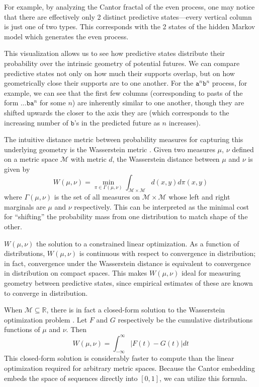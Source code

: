 \documentclass[sigconf, anonymous, review]{acmart}
\begin{document}
For example, by analyzing the Cantor fractal of the even process, one may notice
that there are effectively only 2 distinct predictive states---every vertical
column is just one of two types. This corresponds with the 2 states of the
hidden Markov model which generates the even process.

This visualization allows us to see how predictive states distribute their
probability over the intrinsic geometry of potential futures. We can compare
predictive states not only on how much their supports overlap, but on how
geometrically close their supports are to one another. For the $\mathtt{a}^n
\mathtt{b}^n$ process, for example, we can see that the first few columns
(corresponding to pasts of the form $\dots \mathtt{b a}^n$ for some $n$) are
inherently similar to one another, though they are shifted upwards the closer to
the axis they are (which corresponds to the increasing number of $\mathtt{b}$'s
in the predicted future as $n$ increases).

The intuitive distance metric between probability measures for capturing this
underlying geometry is the Wasserstein metric \cite{Pane19a}. Given two measures
$\mu$, $\nu$ defined on a metric space $\mathcal{M}$ with metric $d$, the
Wasserstein distance between $\mu$ and $\nu$ is given by
\begin{equation*}
  W(\mu,\nu) = \min_{\pi\in \Gamma(\mu,\nu)}
   \int_{\mathcal{M}\times\mathcal{M}} 
   d(x,y) d\pi(x,y)
\end{equation*}
where $\Gamma(\mu,\nu)$ is the set of all measures on
$\mathcal{M}\times\mathcal{M}$ whose left and right marginals are $\mu$ and
$\nu$ respectively. This can be interpreted as the minimal cost for ``shifting''
the probability mass from one distribution to match shape of the other. 

$W(\mu,\nu)$ the solution to a constrained linear optimization. As a function of
distributions, $W(\mu,\nu)$ is continuous with respect to convergence in
distribution; in fact, convergence under the Wasserstein distance is equivalent
to convergence in distribution on compact spaces. This makes $W(\mu,\nu)$ ideal
for measuring geometry between predictive states, since empirical estimates of
these are known to converge in distribution.

When $\mathcal{M} \subseteq \mathbb{R}$, there is in fact a closed-form solution
to the Wasserstein optimization problem \cite{Thas10a}. Let $F$ and $G$
respectively be the cumulative distributions functions of $\mu$ and $\nu$. Then
\begin{equation}
  W(\mu,\nu) = \int_{-\infty}^\infty \left|F(t)-G(t)\right| dt
\end{equation}
This closed-form solution is considerably faster to compute than the linear
optimization required for arbitrary metric spaces. Because the Cantor embedding
embeds the space of sequences directly into $[0,1]$, we can utilize this
formula.
\end{document}
